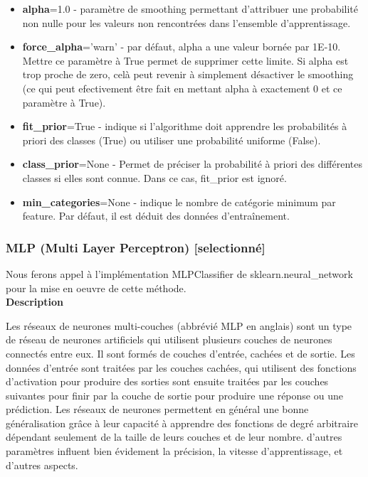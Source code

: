 \documentclass{ceri/sty/rapport}
\begin{document}
\begin{itemize}
    \item \textbf{alpha}=1.0 - paramètre de smoothing permettant d'attribuer une probabilité non nulle pour les valeurs non rencontrées dans l'ensemble d'apprentissage.\\
    
    \item \textbf{force\_alpha}='warn' - par défaut, alpha a une valeur bornée par 1E-10. Mettre ce paramètre à True permet de supprimer cette limite. Si alpha est trop proche de zero, celà peut revenir à simplement désactiver le smoothing (ce qui peut efectivement être fait en mettant alpha à exactement 0 et ce paramètre à True).\\
    
    \item \textbf{fit\_prior}=True - indique si l'algorithme doit apprendre les probabilités à priori des classes (True) ou utiliser une probabilité uniforme (False).\\
    
    \item \textbf{class\_prior}=None - Permet de préciser la probabilité à priori des différentes classes si elles sont connue. Dans ce cas, fit\_prior est ignoré.\\
    
    \item \textbf{min\_categories}=None - indique le nombre de catégorie minimum par feature. Par défaut, il est déduit des données d'entraînement.\\
\end{itemize}


\subsubsection{MLP (Multi Layer Perceptron) [selectionné]}

Nous ferons appel à l'implémentation MLPClassifier de sklearn.neural\_network pour la mise en oeuvre de cette méthode.\\

\textbf{Description}

Les réseaux de neurones multi-couches (abbrévié MLP en anglais) sont un type de réseau de neurones artificiels qui utilisent plusieurs couches de neurones connectés entre eux. Il sont formés de couches d'entrée, cachées et de sortie. Les données d'entrée sont traitées par les couches cachées, qui utilisent des fonctions d'activation pour produire des sorties sont ensuite traitées par les couches suivantes pour finir par la couche de sortie pour produire une réponse ou une prédiction. Les réseaux de neurones permettent en général une bonne généralisation grâce à leur capacité à apprendre des fonctions de degré arbitraire dépendant seulement de la taille de leurs couches et de leur nombre. d'autres paramètres influent bien évidement la précision, la vitesse d'apprentissage, et d'autres aspects.\\
\end{document}
